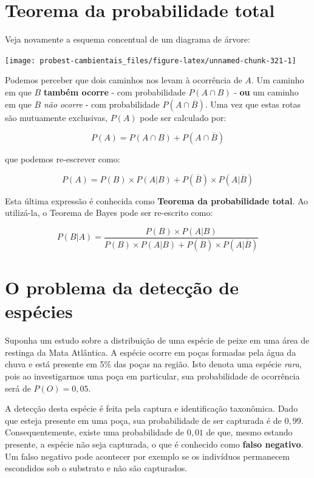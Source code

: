 \documentclass[
]{book}
\begin{document}
\hypertarget{teorema-da-probabilidade-total}{%
\section{Teorema da probabilidade total}\label{teorema-da-probabilidade-total}}

Veja novamente a esquema concentual de um diagrama de árvore:

\begin{center}\texttt{[image: probest-cambientais\_files/figure-latex/unnamed-chunk-321-1]} \end{center}

Podemos perceber que dois caminhos nos levam à ocorrência de \(A\). Um caminho em que \(B\) \textbf{também ocorre} - com probabilidade \(P(A \cap B)\) - \textbf{ou} um caminho em que \(B\) \emph{não ocorre} - com probabilidade \(P(A \cap \overline{B})\). Uma vez que estas rotas são mutuamente exclusivas, \(P(A)\) pode ser calculado por:

\[P(A) = P(A \cap B) + P(A \cap \overline{B})\]

que podemos re-escrever como:

\[P(A) = P(B) \times P(A|B) + P(\overline{B}) \times P(A|\overline{B})\]

Esta última expressão é conhecida como \textbf{Teorema da probabilidade total}. Ao utilizá-la, o Teorema de Bayes pode ser re-escrito como:

\[P(B|A) = \frac{P(B) \times P(A|B)}{P(B) \times P(A|B) + P(\overline{B}) \times P(A|\overline{B})}\]

\hypertarget{o-problema-da-detecuxe7uxe3o-de-espuxe9cies}{%
\section{O problema da detecção de espécies}\label{o-problema-da-detecuxe7uxe3o-de-espuxe9cies}}

Suponha um estudo sobre a distribuição de uma espécie de peixe em uma área de restinga da Mata Atlântica. A espécie ocorre em poças formadas pela água da chuva e está presente em 5\% das poças na região. Isto denota uma espécie \emph{rara}, pois ao investigarmos uma poça em particular, sua probabilidade de ocorrência será de \(P(O) = 0,05\).

A detecção desta espécie é feita pela captura e identificação taxonômica. Dado que esteja presente em uma poça, sua probabilidade de ser capturada é de \(0,99\). Consequentemente, existe uma probabilidade de \(0,01\) de que, mesmo estando presente, a espécie não seja capturada, o que é conhecido como \textbf{falso negativo}. Um falso negativo pode acontecer por exemplo se os indivíduos permanecem escondidos sob o substrato e não são capturados.
\end{document}
